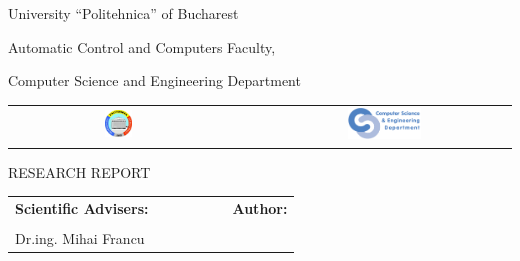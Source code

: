 \begin{titlepage}
	\begin{center}
		{\Large University ``Politehnica'' of Bucharest}
		\par\vspace*{2mm}
		{\Large Automatic Control and Computers Faculty,
		
		Computer Science and Engineering Department}
		\par\vspace*{3mm}
		\begin{table}[h]
        	\begin{center}
				\begin{tabular}{cccc}
                    \includegraphics[width=0.13\textwidth]{src/img/branding/upb}
					& & &
					\includegraphics[width=0.30\textwidth]{src/img/branding/cs}
            	\end{tabular}
			\end{center}
		\end{table}
		
		\par\vspace*{35mm}
		{\Huge RESEARCH REPORT}
		\par\vspace*{15mm}
		{\Huge \VARtitleen }
		\par\vspace*{35mm}
		\begin{table}[h]
        	\begin{center}
				\begin{tabular}{lcccccl}
					\Large \textbf{\Large Scientific Advisers:}
					\vspace*{1mm} &&&&&& \Large \textbf{\Large Author:}\vspace*{1mm} \\
					\Large \VARadviser &&&&&& \Large \VARauthor \\
					\Large Dr.ing. Mihai Francu
				\end{tabular}
			\end{center}
		\end{table}

		\par\vspace*{35mm}
		\Large \VARtitlefooteren
	\end{center}
\end{titlepage}

